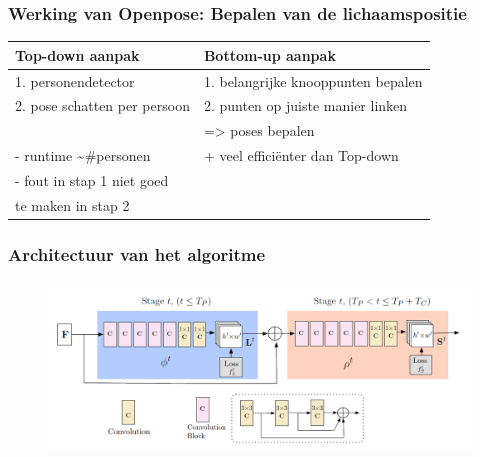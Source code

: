 \documentclass
   [kulak] %
   {kulakbeamer}
\begin{document}
\begin{frame}
\frametitle{Werking van Openpose: Bepalen van de lichaamspositie}

\begin{center}
	\begin{tabular}{l|l} 
		\textbf{Top-down aanpak} & \textbf{Bottom-up aanpak}\\
		\hline
		1. personendetector & 1. belangrijke knooppunten bepalen\\
		2. pose schatten per persoon & 2. punten op juiste manier linken\\
		& => poses bepalen\\
		\hline
		- runtime \textasciitilde \#personen  & + veel efficiënter dan Top-down\\
		- fout in stap 1 niet goed  & \\
		 te maken in stap 2 & \\
	\end{tabular}
\end{center}
\end{frame}

\begin{frame}
\frametitle{Architectuur van het algoritme}
	\begin{figure}
		\centering
		\includegraphics[width=\textwidth]{algoritme_architectuur}
	\end{figure}
\end{frame}
\end{document}
